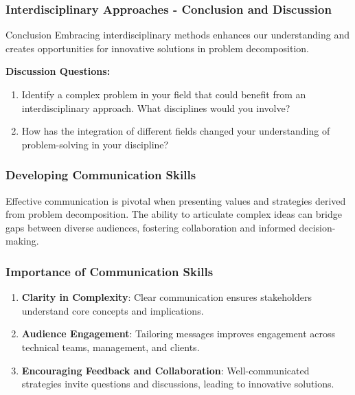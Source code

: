 \documentclass[aspectratio=169]{beamer}
\begin{document}
\begin{frame}[fragile]
    \frametitle{Interdisciplinary Approaches - Conclusion and Discussion}
    \begin{block}{Conclusion}
        Embracing interdisciplinary methods enhances our understanding and creates opportunities for innovative solutions in problem decomposition.
    \end{block}
    \textbf{Discussion Questions:}
    \begin{enumerate}
        \item Identify a complex problem in your field that could benefit from an interdisciplinary approach. What disciplines would you involve?
        \item How has the integration of different fields changed your understanding of problem-solving in your discipline?
    \end{enumerate}
\end{frame}

\begin{frame}[fragile]
    \frametitle{Developing Communication Skills}
    Effective communication is pivotal when presenting values and strategies derived from problem decomposition. 
    The ability to articulate complex ideas can bridge gaps between diverse audiences, fostering collaboration and informed decision-making.
\end{frame}

\begin{frame}[fragile]
    \frametitle{Importance of Communication Skills}
    \begin{enumerate}
        \item \textbf{Clarity in Complexity}: Clear communication ensures stakeholders understand core concepts and implications.
        \item \textbf{Audience Engagement}: Tailoring messages improves engagement across technical teams, management, and clients.
        \item \textbf{Encouraging Feedback and Collaboration}: Well-communicated strategies invite questions and discussions, leading to innovative solutions.
    \end{enumerate}
\end{frame}
\end{document}

